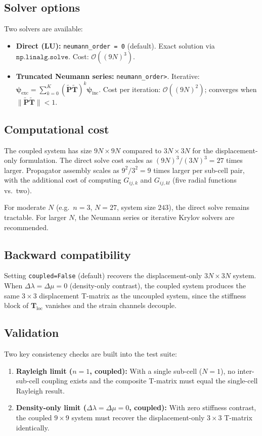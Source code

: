 \documentclass[11pt,a4paper]{article}
\newcommand{\order}[1]{\mathcal{O}\!\left(#1\right)}
\newcommand{\bT}{\mathbf{T}}
\newcommand{\Dlam}{\Delta\lambda}
\newcommand{\Dmu}{\Delta\mu}
\newcommand{\bP}{\mathbf{P}}
\newcommand{\bpsi}{\boldsymbol{\psi}}
\begin{document}
\subsection{Solver options}

Two solvers are available:
\begin{itemize}
  \item \textbf{Direct (LU):} \texttt{neumann\_order = 0} (default).
    Exact solution via $\texttt{np.linalg.solve}$.  Cost:
    $\order{(9N)^3}$.
  \item \textbf{Truncated Neumann series:}
    \texttt{neumann\_order\;>}.
    Iterative:
    $\bpsi_\text{exc} = \sum_{k=0}^{K}
      (\tilde{\bP}\tilde{\bT})^k \bpsi_\text{inc}$.
    Cost per iteration: $\order{(9N)^2}$; converges when
    $\|\tilde{\bP}\tilde{\bT}\| < 1$.
\end{itemize}

\subsection{Computational cost}

The coupled system has size $9N \times 9N$ compared to
$3N \times 3N$ for the displacement-only formulation.  The direct
solve cost scales as $(9N)^3 / (3N)^3 = 27$ times larger.
Propagator assembly scales as $9^2 / 3^2 = 9$ times larger per
sub-cell pair, with the additional cost of computing $G_{ij,k}$ and
$G_{ij,kl}$ (five radial functions vs.\ two).

For moderate $N$ (e.g.\ $n = 3$, $N = 27$, system size $243$), the
direct solve remains tractable.  For larger $N$, the Neumann series
or iterative Krylov solvers are recommended.

\subsection{Backward compatibility}

Setting \texttt{coupled=False} (default) recovers the
displacement-only $3N \times 3N$ system.  When $\Dlam = \Dmu = 0$
(density-only contrast), the coupled system produces the same
$3 \times 3$ displacement T-matrix as the uncoupled system, since
the stiffness block of $\bT_\text{loc}$ vanishes and the strain
channels decouple.

\subsection{Validation}

Two key consistency checks are built into the test suite:
\begin{enumerate}
  \item \textbf{Rayleigh limit ($n = 1$, coupled):}  With a single
    sub-cell ($N = 1$), no inter-sub-cell coupling exists and the
    composite T-matrix must equal the single-cell Rayleigh result.
  \item \textbf{Density-only limit ($\Dlam = \Dmu = 0$, coupled):}
    With zero stiffness contrast, the coupled $9 \times 9$ system
    must recover the displacement-only $3 \times 3$ T-matrix
    identically.
\end{enumerate}
\end{document}
